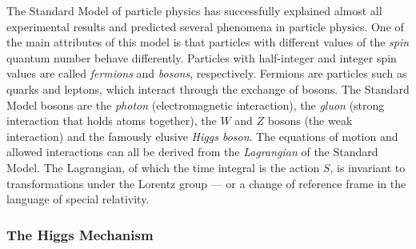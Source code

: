 \documentclass[twoside,english]{uiofysmaster}
\begin{document}
The Standard Model of particle physics has successfully explained almost all experimental results and predicted several phenomena in particle physics. One of the main attributes of this model is that particles with different values of the \textit{spin} quantum number behave differently. Particles with half-integer and integer spin values are called \textit{fermions} and \textit{bosons}, respectively. Fermions are particles such as quarks and leptons, which interact through the exchange of bosons. The Standard Model bosons are the \textit{photon} (electromagnetic interaction), the \textit{gluon} (strong interaction that holds atoms together), the $W$ and $Z$ bosons (the weak interaction) and the famously elusive \textit{Higgs boson}. The equations of motion and allowed interactions can all be derived from the \textit{Lagrangian} of the Standard Model. The Lagrangian, of which the time integral is the action $S$, is invariant to transformations under the Lorentz group --- or a change of reference frame in the language of special relativity. 

\subsubsection{The Higgs Mechanism}
\end{document}
